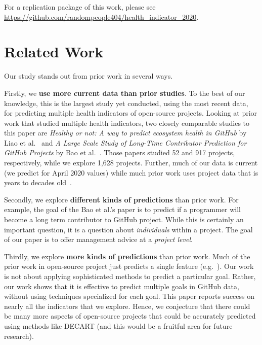 \documentclass[sigconf,anonymous,review]{acmart}
\begin{document}
 

For a replication package of this work, please see   \url{https://github.com/randompeople404/health_indicator_2020}.
\vspace{-3mm}


\section{Related Work}
\label{sect:related}

 
Our study stands out from prior work in several ways.

Firstly, we {\bf use more current data than prior studies}.
To the best of our knowledge, this is the largest study yet conducted, using the most recent data,  for predicting multiple health indicators of open-source projects.
Looking at prior work that studied multiple health indicators,
two closely  comparable studies to this paper are {\em Healthy or not: A way to predict ecosystem health in GitHub} by 
Liao et al.~\cite{liao2019healthy}
and{ \em A Large Scale Study of Long-Time Contributor Prediction for GitHub Projects} by
Bao et al.~\cite{bao2019large}.
Those papers studied 52 and 917 projects, respectively, while we explore 1,628 projects. Further, much of our data is current (we predict for April 2020 values) while much prior work uses project data that is years to decades old~\cite{sarro2016multi}.

Secondly, we explore {\bf different kinds of predictions} than prior work. For example, the goal of the
Bao et al.'s paper is to predict if 
a programmer will become a long term  contributor to GitHub project.
While this is certainly   an important question, it is a question about {\em individuals} within a project. The goal of our paper is to offer management advice at a  {\em project level}.

Thirdly, we explore {\bf more kinds of predictions}
than prior work.
Much of the  prior work in open-source project just predicts a single feature (e.g.~\cite{borges2016predicting,kikas2016using,chen2014predicting,weber2014makes,bao2019large}).   
Our work is not about applying sophisticated methods to predict a particular goal. Rather, our work shows that it is effective to predict multiple goals in GitHub data, without using techniques specialized for  each goal.
This paper reports success on nearly all the indicators that we explore.  Hence, 
we conjecture that there could be many more aspects of open-source projects that could
be accurately predicted using methods like DECART (and this would be a fruitful area for future research).
\end{document}
